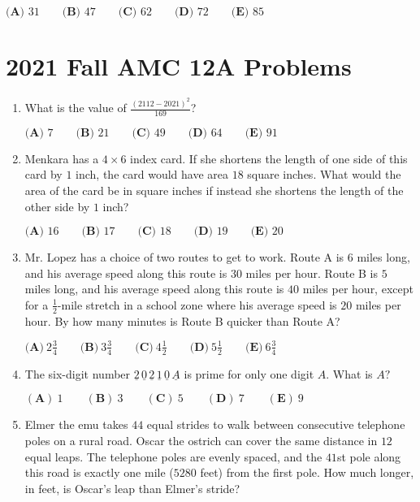\documentclass{article}
\begin{document}
\begin{enumerate}[label=\arabic*., itemsep=0.5em]
\(\textbf{(A) }31 \qquad \textbf{(B) }47 \qquad \textbf{(C) }62\qquad \textbf{(D) }72 \qquad \textbf{(E) }85\)\par \vspace{0.5em}
\end{enumerate}
\newpage\section*{2021 Fall AMC 12A Problems}

\begin{enumerate}[label=\arabic*., itemsep=0.5em]
\item What is the value of \(\frac{(2112-2021)^2}{169}\)?

\(\textbf{(A) } 7 \qquad\textbf{(B) } 21 \qquad\textbf{(C) } 49 \qquad\textbf{(D) } 64 \qquad\textbf{(E) } 91\)\par \vspace{0.5em}\item Menkara has a \(4 \times 6\) index card. If she shortens the length of one side of this card by \(1\) inch, the card would have area \(18\) square inches. What would the area of the card be in square inches if instead she shortens the length of the other side by \(1\) inch?

\(\textbf{(A) }16\qquad\textbf{(B) }17\qquad\textbf{(C) }18\qquad\textbf{(D) }19\qquad\textbf{(E) }20\)\par \vspace{0.5em}\item Mr. Lopez has a choice of two routes to get to work. Route A is \(6\) miles long, and his average speed along this route is \(30\) miles per hour. Route B is \(5\) miles long, and his average speed along this route is \(40\) miles per hour, except for a \(\frac{1}{2}\)-mile stretch in a school zone where his average speed is \(20\) miles per hour. By how many minutes is Route B quicker than Route A?

\(\textbf{(A)}\ 2 \frac{3}{4}  \qquad\textbf{(B)}\  3 \frac{3}{4} \qquad\textbf{(C)}\  4 \frac{1}{2} \qquad\textbf{(D)}\
 5 \frac{1}{2} \qquad\textbf{(E)}\ 6 \frac{3}{4}\)\par \vspace{0.5em}\item The six-digit number \(\underline{2}\,\underline{0}\,\underline{2}\,\underline{1}\,\underline{0}\,\underline{A}\) is prime for only one digit \(A.\) What is \(A?\)

\((\textbf{A})\: 1\qquad(\textbf{B}) \: 3\qquad(\textbf{C}) \: 5 \qquad(\textbf{D}) \: 7\qquad(\textbf{E}) \: 9\)\par \vspace{0.5em}\item Elmer the emu takes \(44\) equal strides to walk between consecutive telephone poles on a rural road. Oscar the ostrich can cover the same distance in \(12\) equal leaps. The telephone poles are evenly spaced, and the \(41\)st pole along this road is exactly one mile (\(5280\) feet) from the first pole. How much longer, in feet, is Oscar's leap than Elmer's stride?


\end{enumerate}
\end{document}
